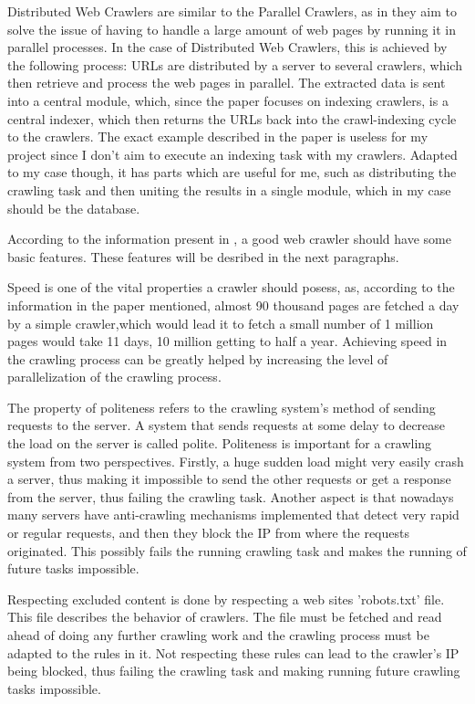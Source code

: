 \documentclass[12pt,a4paper,twoside]{report}
\begin{document}
Distributed Web Crawlers are similar to the Parallel Crawlers, as in they aim to solve the issue of having to handle a large amount of web pages by running it in parallel processes. In the case of Distributed Web Crawlers, this is achieved by the following process: URLs are distributed by a server to several crawlers, which then retrieve and process the web pages in parallel. The extracted data is sent into a central module, which, since the paper focuses on indexing crawlers, is a central indexer, which then returns the URLs back into the crawl-indexing cycle to the crawlers. The exact example described in the paper is useless for my project since I don't aim to execute an indexing task with my crawlers. Adapted to my case though, it has parts which are useful for me, such as distributing the crawling task and then uniting the results in a single module, which in my case should be the database.

According to the information present in \cite{crawlers_paper1}, a good web crawler should have some basic features. These features will be desribed in the next paragraphs.

Speed is one of the vital properties a crawler should posess, as, according to the information in the paper mentioned, almost 90 thousand pages are fetched a day by a simple crawler,which would lead it to fetch a small number of 1 million pages would take 11 days, 10 million getting to half a year. Achieving speed in the crawling process can be greatly helped by increasing the level of parallelization of the crawling process.

The property of politeness refers to the crawling system's method of sending requests to the server. A system that sends requests at some delay to decrease the load on the server is called polite. Politeness is important for a crawling system from two perspectives. Firstly, a huge sudden load might very easily crash a server, thus making it impossible to send the other requests or get a response from the server, thus failing the crawling task. Another aspect is that nowadays many servers have anti-crawling mechanisms implemented that detect very rapid or regular requests, and then they block the IP from where the requests originated. This possibly fails the running crawling task and makes the running of future tasks impossible.

Respecting excluded content is done by respecting a web sites 'robots.txt' file. This file describes the behavior of crawlers. The file must be fetched and read ahead of doing any further crawling work and the crawling process must be adapted to the rules in it. Not respecting these rules can lead to the crawler's IP being blocked, thus failing the crawling task and making running future crawling tasks impossible.
\end{document}
